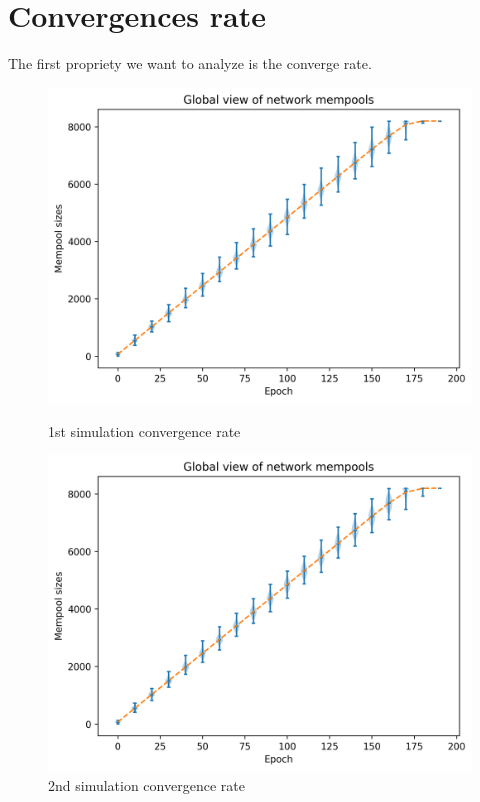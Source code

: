 \documentclass[mscthesis]{usiinfthesis}
\begin{document}
\section{Convergences rate}
The first propriety we want to analyze is the converge rate. 

\begin{figure}[!htb]
   \begin{minipage}{0.49\textwidth}
     \centering
     \includegraphics[width=\linewidth]{images/1/1-convergence.png}
  	\caption{1st simulation convergence rate}
  	\label{fig:sim-one-conv}
   \end{minipage}\hfill
   \begin{minipage}{0.49\textwidth}
     \centering
     \includegraphics[width=\linewidth]{images/2/two-convergence.png}
       \caption{2nd simulation convergence rate}
 		\label{fig:sim-two-conv}
   \end{minipage}
\end{figure}
\end{document}
